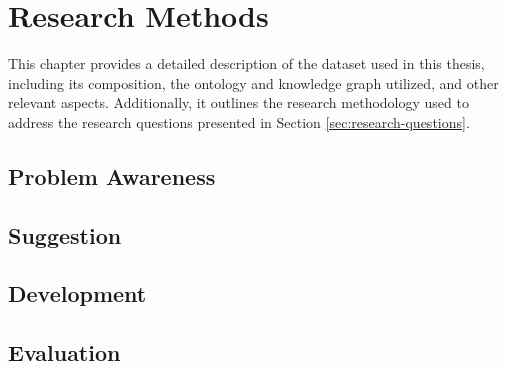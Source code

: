 \chapter{Research Methods}\label{chap:research-methods}
This chapter provides a detailed description of the dataset used in this thesis, including its composition, the ontology and knowledge graph utilized, and other relevant aspects.
Additionally, it outlines the research methodology used to address the research questions presented in Section \ref{sec:research-questions}.

%
\section{Problem Awareness}

%
\section{Suggestion}

%
\section{Development}

%
\section{Evaluation}
